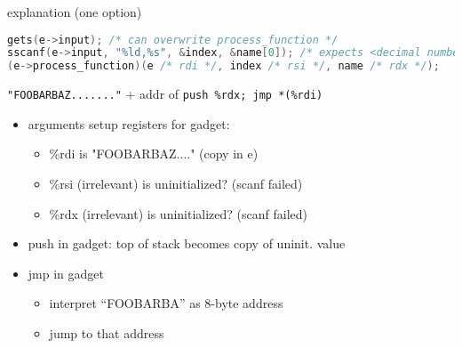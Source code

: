 \begin{soln}
\begin{frame}[fragile,label=useFPtrOverwrite1Explain]{explanation (one option)}
\begin{lstlisting}[language=C++,style=script]
gets(e->input); /* can overwrite process_function */
sscanf(e->input, "%ld,%s", &index, &name[0]); /* expects <decimal number>,<string> */
(e->process_function)(e /* rdi */, index /* rsi */, name /* rdx */);
\end{lstlisting}
\texttt{"FOOBARBAZ......."} + addr of \texttt{push \%rdx; jmp *(\%rdi)}
\begin{itemize}
\item arguments setup registers for gadget:
\begin{itemize}
    \item \%rdi is "FOOBARBAZ...." (copy in e)
    \item \%rsi (irrelevant) is uninitialized? (scanf failed)
    \item \%rdx (irrelevant) is uninitialized? (scanf failed)
\end{itemize}
\item push in gadget: top of stack becomes copy of uninit. value 
\item jmp in gadget
    \begin{itemize}
    \item interpret ``FOOBARBA'' as 8-byte address
    \item jump to that address
    \end{itemize}
\end{itemize}
\end{frame}


\end{soln}
